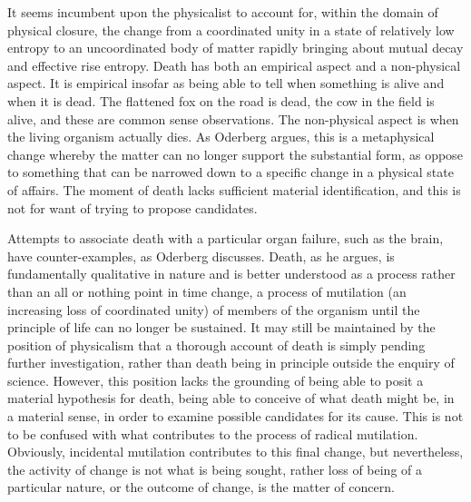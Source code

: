 It seems incumbent upon the physicalist to account for, within the domain of physical closure, the change from a coordinated unity in a state of relatively low entropy to an uncoordinated body of matter rapidly bringing about mutual decay and effective rise entropy.
Death has both an empirical aspect and a non-physical aspect. It is empirical insofar as being able to tell when something is alive and when it is dead. The flattened fox on the road is dead, the cow in the field is alive, and these are common sense observations. The non-physical aspect is when the living organism actually dies. As Oderberg argues, this is a metaphysical change whereby the matter can no longer support the substantial form, as oppose to something that can be narrowed down to a specific change in a physical state of affairs. \parencite[][]{Oderberg2017Death} The moment of death lacks sufficient material identification, and this is not for want of trying to propose candidates.

Attempts to associate death with a particular organ failure, such as the brain, have counter-examples, as Oderberg discusses. Death, as he argues, is fundamentally qualitative in nature and is better understood as a process rather than an all or nothing point in time change, a process of mutilation (an increasing loss of coordinated unity) of members of the organism until the principle of life can no longer be sustained. It may still be maintained by the position of physicalism that a thorough account of death is simply pending further investigation, rather than death being in principle outside the enquiry of science. However, this position lacks the grounding of being able to posit a material hypothesis for death, being able to conceive of what death might be, in a material sense, in order to examine possible candidates for its cause. This is not to be confused with what contributes to the process of radical mutilation. Obviously, incidental mutilation contributes to this final change, but nevertheless, the activity of change is not what is being sought, rather loss of being of a particular nature, or the outcome of change, is the matter of concern.


